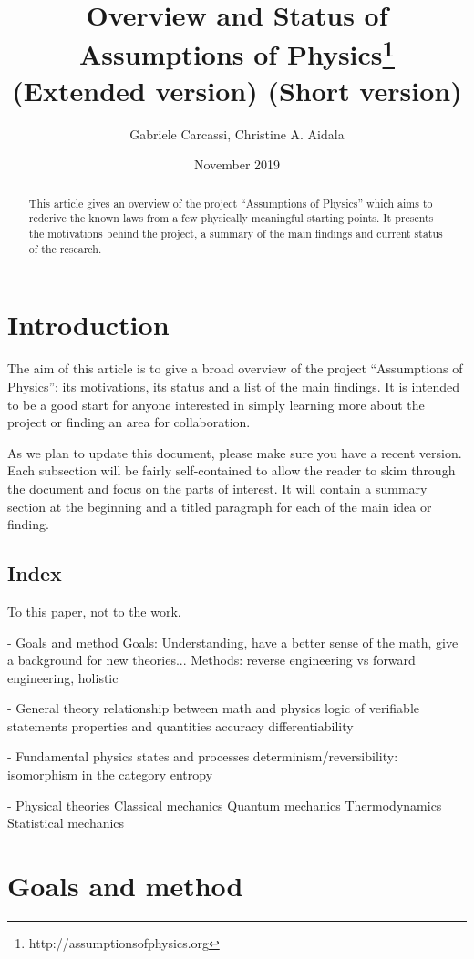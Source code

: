 \documentclass[twocolumn]{article}
\title{Overview and Status of Assumptions of Physics\footnote{http://assumptionsofphysics.org} \\
\ifextended (Extended version)
\else (Short version)
\fi}
\author{Gabriele Carcassi, Christine A. Aidala}
\date{November 2019}
\begin{document}
\maketitle

\begin{abstract}
	This article gives an overview of the project ``Assumptions of Physics'' which aims to rederive the known laws from a few physically meaningful starting points. It presents the motivations behind the project, a summary of the main findings and current status of the research.	
\end{abstract}

\section{Introduction}

The aim of this article is to give a broad overview of the project ``Assumptions of Physics'': its motivations, its status and a list of the main findings. It is intended to be a good start for anyone interested in simply learning more about the project or finding an area for collaboration.

As we plan to update this document, please make sure you have a recent version. Each subsection will be fairly self-contained to allow the reader to skim through the document and focus on the parts of interest. It will contain a summary section at the beginning and a titled paragraph for each of the main idea or finding.

\subsection{Index}
To this paper, not to the work.

- Goals and method
Goals: Understanding, have a better sense of the math, give a background for new theories...
Methods: reverse engineering vs forward engineering, holistic

- General theory
relationship between math and physics
logic of verifiable statements
properties and quantities
accuracy
differentiability

- Fundamental physics
states and processes
determinism/reversibility: isomorphism in the category
entropy

- Physical theories
Classical mechanics
Quantum mechanics
Thermodynamics
Statistical mechanics

\section{Goals and method}
\end{document}
